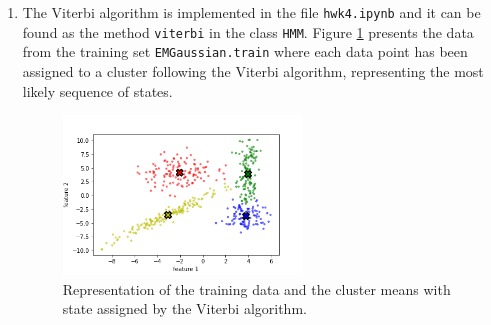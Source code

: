 \documentclass[11pt]{article}
\begin{document}
\begin{enumerate}
\begin{algorithm}
    \caption{Viterbi Algorithm}
    \label{alg:pseudo_viterbi}
\end{algorithm}


\item %

The Viterbi algorithm is implemented in the file \texttt{hwk4.ipynb} and it can be found as the method \texttt{viterbi} in the class \texttt{HMM}. Figure \ref{fig:viterbi_2d} presents the data from the training set \texttt{EMGaussian.train} where each data point has been assigned to a cluster following the Viterbi algorithm, representing the most likely sequence of states.

\begin{figure}[htbp]
\begin{center}
\includegraphics[width=0.6\textwidth]{figures/viterbi_2d.png}

\caption{Representation of the training data and the cluster means with state assigned by the Viterbi algorithm.}
\label{fig:viterbi_2d}
\end{center}
\end{figure}



\end{enumerate}
\end{document}
